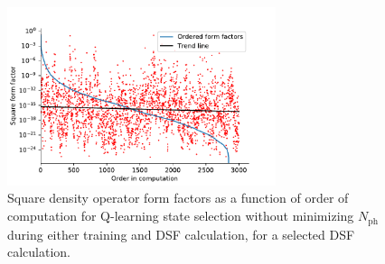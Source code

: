 \documentclass[11pt, a4paper]{report} %
\begin{document}
\begin{figure}[tb!]
  \centering
  \includegraphics[width=0.7\textwidth]{ff_sizes_rand_False_check_train_False_check_eval_False.pdf}
  \caption{Square density operator form factors as a function of order of computation for Q-learning state selection without minimizing \(N_{\mathrm{ph}}\) during either training and DSF calculation, for a selected DSF calculation.}\label{fig:ff_sizes_rand_False_check_train_False_check_eval_False}
\end{figure}
\end{document}
